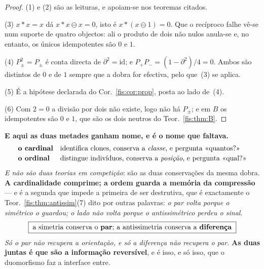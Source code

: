 \documentclass[livro.tex]{subfiles}
\begin{document}
\begin{proof}
(1) e (2) são as leituras, e apoiam-se nos teoremas citados.

(3) $x\ast x=x$ dá $x\ast x\ominus x=0$, isto é $x\ast(x\ominus1)=0$. Que o
recíproco falhe vê-se num suporte de quatro objectos: ali o produto de dois não
nulos anula-se e, no entanto, os únicos idempotentes são $0$ e $1$.

(4) $P_{\pm}^{2}=P_{\pm}$ é conta directa de $\partial^{2}=\mathrm{id}$; e
$P_{+}P_{-}=(1-\partial^{2})/4=0$. Ambos são distintos de $0$ e de $1$ sempre que
a dobra for efectiva, pelo que~(3) se aplica.

(5) É a hipótese declarada do Cor.~\ref{fis:cor:prop}, posta ao lado de~(4).

(6) Com $2=0$ a divisão por dois não existe, logo não há $P_{\pm}$; e em $B$ os
idempotentes são $0$ e $1$, que são os dois neutros do Teor.~\ref{fis:thm:B}.
\end{proof}


\medskip\noindent\textbf{E aqui as duas metades ganham nome, e é o nome que
faltava.}
\[
\begin{array}{ll}
\textbf{o cardinal} & \text{identifica clones, conserva a \emph{classe}, e pergunta «quantos?»}\\[2pt]
\textbf{o ordinal} & \text{distingue indivíduos, conserva a \emph{posição}, e pergunta «qual?»}
\end{array}
\]
\emph{E não são duas teorias em competição}: são as duas conservações da mesma
dobra. \textbf{A cardinalidade comprime; a ordem guarda a memória da compressão}
--- e é a segunda que impede a primeira de ser destrutiva, que é exactamente o
Teor.~\ref{fis:thm:antissim}(7) dito por outras palavras: \emph{o par volta
porque o simétrico o guardou; o lado não volta porque o antissimétrico perdeu o
sinal}.
\[
\boxed{\;\text{a simetria conserva o \textbf{par}; a antissimetria conserva a \textbf{diferença}}\;}
\]
\emph{Só o par não recupera a orientação, e só a diferença não recupera o par.}
\textbf{As duas juntas é que são a informação reversível}, e é isso, e só isso,
que o duomorfismo faz a interface entre.
\end{document}
